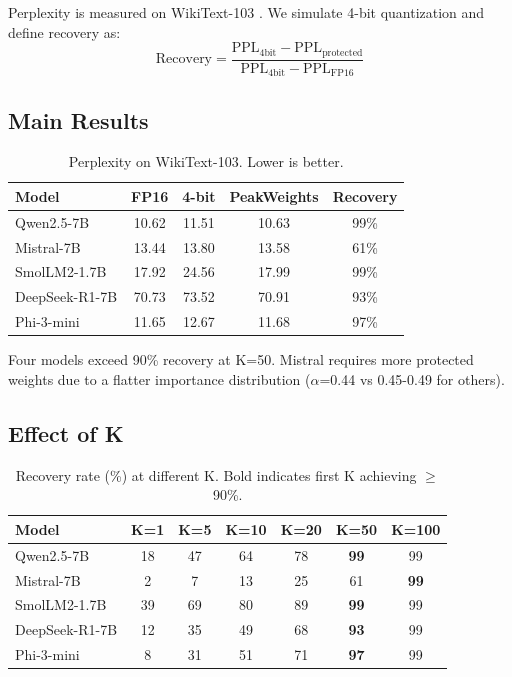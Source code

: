 \documentclass{article}
\begin{document}
Perplexity is measured on WikiText-103 \citep{merity2016wikitext}. We simulate 4-bit quantization and define recovery as:
\begin{equation}
\text{Recovery} = \frac{\text{PPL}_\text{4bit} - \text{PPL}_\text{protected}}{\text{PPL}_\text{4bit} - \text{PPL}_\text{FP16}}
\end{equation}

\subsection{Main Results}

\begin{table}[H]
\centering
\caption{Perplexity on WikiText-103. Lower is better.}
\begin{tabular}{lcccc}
\toprule
\textbf{Model} & \textbf{FP16} & \textbf{4-bit} & \textbf{PeakWeights} & \textbf{Recovery} \\
\midrule
Qwen2.5-7B & 10.62 & 11.51 & 10.63 & 99\% \\
Mistral-7B & 13.44 & 13.80 & 13.58 & 61\% \\
SmolLM2-1.7B & 17.92 & 24.56 & 17.99 & 99\% \\
DeepSeek-R1-7B & 70.73 & 73.52 & 70.91 & 93\% \\
Phi-3-mini & 11.65 & 12.67 & 11.68 & 97\% \\
\bottomrule
\end{tabular}
\label{tab:main}
\end{table}

Four models exceed 90\% recovery at K=50. Mistral requires more protected weights due to a flatter importance distribution ($\alpha$=0.44 vs 0.45-0.49 for others).

\subsection{Effect of K}

\begin{table}[H]
\centering
\caption{Recovery rate (\%) at different K. Bold indicates first K achieving $\geq$90\%.}
\begin{tabular}{lcccccc}
\toprule
\textbf{Model} & \textbf{K=1} & \textbf{K=5} & \textbf{K=10} & \textbf{K=20} & \textbf{K=50} & \textbf{K=100} \\
\midrule
Qwen2.5-7B & 18 & 47 & 64 & 78 & \textbf{99} & 99 \\
Mistral-7B & 2 & 7 & 13 & 25 & 61 & \textbf{99} \\
SmolLM2-1.7B & 39 & 69 & 80 & 89 & \textbf{99} & 99 \\
DeepSeek-R1-7B & 12 & 35 & 49 & 68 & \textbf{93} & 99 \\
Phi-3-mini & 8 & 31 & 51 & 71 & \textbf{97} & 99 \\
\bottomrule
\end{tabular}
\label{tab:k}
\end{table}
\end{document}
